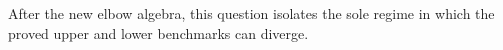 After the new elbow algebra, this question isolates the sole regime in which the proved upper and lower benchmarks can diverge.